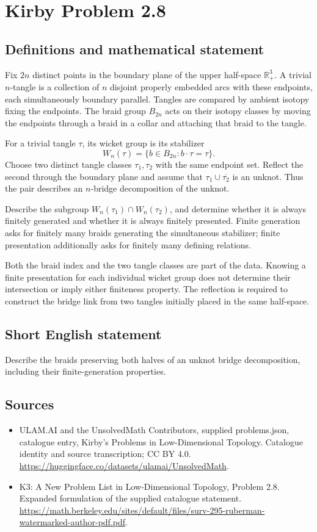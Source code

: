 \documentclass[11pt,a4paper]{article}
\begin{document}
\section*{Kirby Problem 2.8}\label{statement}

\subsection{Definitions and mathematical statement}
Fix $2n$ distinct points in the boundary plane of the upper half-space $\mathbb R^3_+$. A trivial $n$-tangle is a collection of $n$ disjoint properly embedded arcs with these endpoints, each simultaneously boundary parallel. Tangles are compared by ambient isotopy fixing the endpoints. The braid group $B_{2n}$ acts on their isotopy classes by moving the endpoints through a braid in a collar and attaching that braid to the tangle.

For a trivial tangle $\tau$, its wicket group is its stabilizer
\[
W_n(\tau)=\{b\in B_{2n}:b\cdot\tau=\tau\}.
\]
Choose two distinct tangle classes $\tau_1,\tau_2$ with the same endpoint set. Reflect the second through the boundary plane and assume that $\tau_1\cup\overline{\tau_2}$ is an unknot. Thus the pair describes an $n$-bridge decomposition of the unknot.

Describe the subgroup $W_n(\tau_1)\cap W_n(\tau_2)$, and determine whether it is always finitely generated and whether it is always finitely presented. Finite generation asks for finitely many braids generating the simultaneous stabilizer; finite presentation additionally asks for finitely many defining relations.

Both the braid index and the two tangle classes are part of the data. Knowing a finite presentation for each individual wicket group does not determine their intersection or imply either finiteness property. The reflection is required to construct the bridge link from two tangles initially placed in the same half-space.
\subsection{Short English statement}
Describe the braids preserving both halves of an unknot bridge decomposition, including their finite-generation properties.
\subsection{Sources}
\begin{itemize}
\item[S1] ULAM.AI and the UnsolvedMath Contributors, supplied problems.json, catalogue entry, Kirby's Problems in Low-Dimensional Topology. Catalogue identity and source transcription; CC BY 4.0.
\url{https://huggingface.co/datasets/ulamai/UnsolvedMath}.
\item[S2] K3: A New Problem List in Low-Dimensional Topology, Problem 2.8. Expanded formulation of the supplied catalogue statement.
\url{https://math.berkeley.edu/sites/default/files/surv-295-ruberman-watermarked-author-pdf.pdf}.
\end{itemize}
\end{document}
